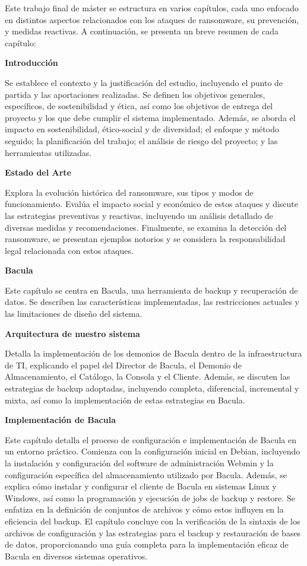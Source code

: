 
Este trabajo final de máster se estructura en varios capítulos, cada uno enfocado en distintos aspectos relacionados con los ataques de ransomware, su prevención, y medidas reactivas. A continuación, se presenta un breve resumen de cada capítulo:\medskip

\textbf{Introducción}

Se establece el contexto y la justificación del estudio, incluyendo el punto de partida y las aportaciones realizadas. Se definen los objetivos generales, específicos, de sostenibilidad y ética, así como los objetivos de entrega del proyecto y los que debe cumplir el sistema implementado. Además, se aborda el impacto en sostenibilidad, ético-social y de diversidad; el enfoque y método seguido; la planificación del trabajo; el análisis de riesgo del proyecto; y las herramientas utilizadas.\bigskip

\textbf{Estado del Arte}

Explora la evolución histórica del ransomware, sus tipos y modos de funcionamiento. Evalúa el impacto social y económico de estos ataques y discute las estrategias preventivas y reactivas, incluyendo un análisis detallado de diversas medidas y recomendaciones. Finalmente, se examina la detección del ransomware, se presentan ejemplos notorios y se considera la responsabilidad legal relacionada con estos ataques.\bigskip

\textbf{Bacula}

Este capítulo se centra en Bacula, una herramienta de backup y recuperación de datos. Se describen las características implementadas, las restricciones actuales y las limitaciones de diseño del sistema.\bigskip

\textbf{Arquitectura de nuestro sistema}

Detalla la implementación de los demonios de Bacula dentro de la infraestructura de TI, explicando el papel del Director de Bacula, el Demonio de Almacenamiento, el Catálogo, la Consola y el Cliente. Además, se discuten las estrategias de backup adoptadas, incluyendo completa, diferencial, incremental y mixta, así como la implementación de estas estrategias en Bacula.\bigskip\bigskip

\textbf{Implementación de Bacula}

Este capítulo detalla el proceso de configuración e implementación de Bacula en un entorno práctico. Comienza con la configuración inicial en Debian, incluyendo la instalación y configuración del software de administración Webmin y la configuración específica del almacenamiento utilizado por Bacula. Además, se explica cómo instalar y configurar el cliente de Bacula en sistemas Linux y Windows, así como la programación y ejecución de jobs de backup y restore. Se enfatiza en la definición de conjuntos de archivos y cómo estos influyen en la eficiencia del backup. El capítulo concluye con la verificación de la sintaxis de los archivos de configuración y las estrategias para el backup y restauración de bases de datos, proporcionando una guía completa para la implementación eficaz de Bacula en diversos sistemas operativos.\bigskip

